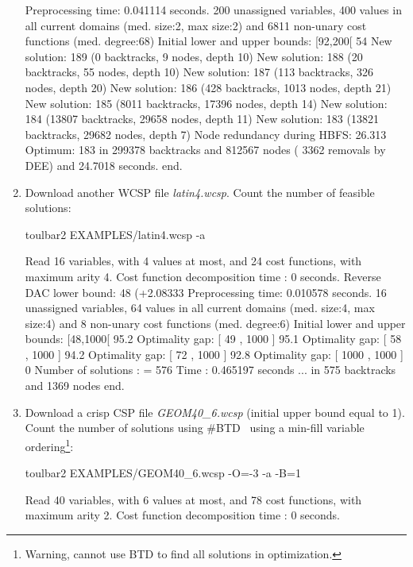 \begin{enumerate}
{\begin{DoxyCode}
Preprocessing time: 0.041114 seconds.
200 unassigned variables, 400 values in all current domains (med. size:2, max size:2) and 6811 non-unary cost functions (med. degree:68)
Initial lower and upper bounds: [92,200[ 54%
New solution: 189 (0 backtracks, 9 nodes, depth 10)
New solution: 188 (20 backtracks, 55 nodes, depth 10)
New solution: 187 (113 backtracks, 326 nodes, depth 20)
New solution: 186 (428 backtracks, 1013 nodes, depth 21)
New solution: 185 (8011 backtracks, 17396 nodes, depth 14)
New solution: 184 (13807 backtracks, 29658 nodes, depth 11)
New solution: 183 (13821 backtracks, 29682 nodes, depth 7)
Node redundancy during HBFS: 26.313 %
Optimum: 183 in 299378 backtracks and 812567 nodes ( 3362 removals by DEE) and 24.7018 seconds.
end.
\end{DoxyCode}}
\item Download another WCSP file {\em latin4.wcsp}. Count the number of feasible solutions:
\begin{DoxyCode}
	toulbar2 EXAMPLES/latin4.wcsp -a
\end{DoxyCode}
{\scriptsize
\begin{DoxyCode}
Read 16 variables, with 4 values at most, and 24 cost functions, with maximum arity 4.
Cost function decomposition time : 0 seconds.
Reverse DAC lower bound: 48 (+2.08333%
Preprocessing time: 0.010578 seconds.
16 unassigned variables, 64 values in all current domains (med. size:4, max size:4) and 8 non-unary cost functions (med. degree:6)
Initial lower and upper bounds: [48,1000[ 95.2%
Optimality gap: [ 49 , 1000 ] 95.1 %
Optimality gap: [ 58 , 1000 ] 94.2 %
Optimality gap: [ 72 , 1000 ] 92.8 %
Optimality gap: [ 1000 , 1000 ] 0 %
Number of solutions    : =  576
Time                   :    0.465197 seconds
... in 575 backtracks and 1369 nodes
end.
\end{DoxyCode}}
\item Download a crisp CSP file {\em GEOM40\_6.wcsp} (initial upper bound equal to 1). Count the number of solutions using \#BTD~\cite{Favier09a} using a min-fill variable ordering\footnote{Warning, cannot use BTD to find all solutions in optimization.}:
\begin{DoxyCode}
	toulbar2 EXAMPLES/GEOM40_6.wcsp -O=-3 -a -B=1
\end{DoxyCode}
{\scriptsize
\begin{DoxyCode}
Read 40 variables, with 6 values at most, and 78 cost functions, with maximum arity 2.
Cost function decomposition time : 0 seconds.

\end{DoxyCode}}
\end{enumerate}
